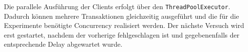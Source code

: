 Die parallele Ausführung der Clients erfolgt über den \texttt{ThreadPoolExecutor}.
Dadurch können mehrere Transaktionen gleichzeitig ausgeführt und die für die Experimente benötigte Concurrency
realisiert werden.
Der nächste Versuch wird erst gestartet, nachdem der vorherige fehlgeschlagen ist und gegebenenfalls der
entsprechende Delay abgewartet wurde.
